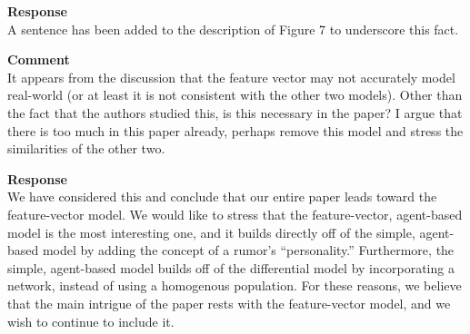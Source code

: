 \textbf{Response } \\
A sentence has been added to the description of Figure 7 to underscore this fact.

\textbf{Comment } \\
It appears from the discussion that the feature vector may not accurately model real-world (or at least it is not consistent with the other two models).
Other than the fact that the authors studied this, is this necessary in the paper?
I argue that there is too much in this paper already, perhaps remove this model and stress the similarities of the other two.

\textbf{Response } \\
We have considered this and conclude that our entire paper leads toward the feature-vector model.
We would like to stress that the feature-vector, agent-based model is the most interesting one, and it builds directly off of the simple, agent-based model by adding the concept of a rumor's ``personality.''
Furthermore, the simple, agent-based model builds off of the differential model by incorporating a network, instead of using a homogenous population.
For these reasons, we believe that the main intrigue of the paper rests with the feature-vector model, and we wish to continue to include it.
